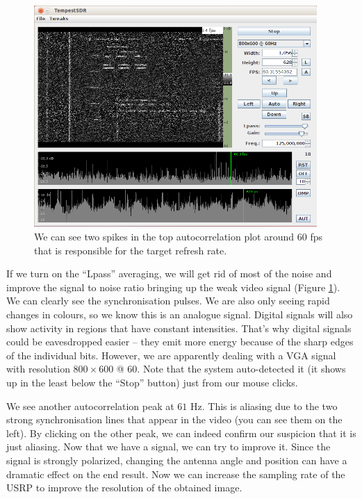 \documentclass[a4paper,12pt,twoside,openright]{report}
\begin{document}
\begin{figure}[h]
\centering
  \includegraphics[width=0.96\textwidth]{demo_receivingimage}
  \caption{We can see two spikes in the top autocorrelation plot around $60$ fps that is responsible for the target refresh rate.}
  \label{fig:demoreception}
\end{figure}

If we turn on the ``Lpass'' averaging, we will get rid of most of the noise and improve the signal to noise ratio bringing up the weak video signal (Figure \ref{fig:demoreception}). We can clearly see the synchronisation pulses. We are also only seeing rapid changes in colours, so we know this is an analogue signal. Digital signals will also show activity in regions that have constant intensities. That's why digital signals could be eavesdropped easier -- they emit more energy because of the sharp edges of the individual bits. However, we are apparently dealing with a VGA signal with resolution $800 \times 600$ @ $60$. Note that the system auto-detected it (it shows up in the least below the ``Stop'' button) just from our mouse clicks.

We see another autocorrelation peak at $61$ Hz. This is aliasing due to the two strong synchronisation lines that appear in the video (you can see them on the left). By clicking on the other peak, we can indeed confirm our suspicion that it is just aliasing. Now that we have a signal, we can try to improve it. Since the signal is strongly polarized, changing the antenna angle and position can have a dramatic effect on the end result. Now we can increase the sampling rate of the USRP to improve the resolution of the obtained image.
\end{document}
